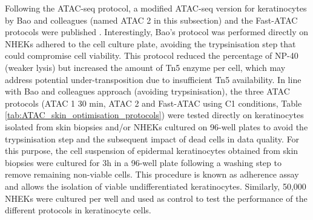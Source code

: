 Following the ATAC-seq protocol, a modified ATAC-seq version for keratinocytes by Bao and colleagues (named ATAC 2 in this subsection) and the Fast-ATAC protocols were published \parencite{Bao2015, Corces2016}. Interestingly, Bao's protocol was performed directly on NHEKs adhered to the cell culture plate, avoiding the trypsinisation step that could compromise cell viability. This protocol reduced the percentage of NP-40 (weaker lysis) but increased the amount of Tn5 enzyme per cell, which may address potential under-transposition due to insufficient Tn5 availability. In line with Bao and colleagues approach (avoiding trypsinisation), the three ATAC protocols (ATAC 1 30 min, ATAC 2 and Fast-ATAC using C1 conditions, Table \ref{tab:ATAC_skin_optimisation_protocols}) were tested directly on keratinocytes isolated from skin biopsies and/or NHEKs cultured on 96-well plates to avoid the trypsinisation step and the subsequent impact of dead cells in data quality. For this purpose, the cell suspension of epidermal keratinocytes obtained from skin biopsies were cultured for 3h in a 96-well plate following a washing step to remove remaining non-viable cells. This procedure is known as adherence assay and allows the isolation of viable undifferentiated keratinocytes. Similarly, 50,000 NHEKs were cultured per well and used as control to test the performance of the different protocols in keratinocyte cells. 



